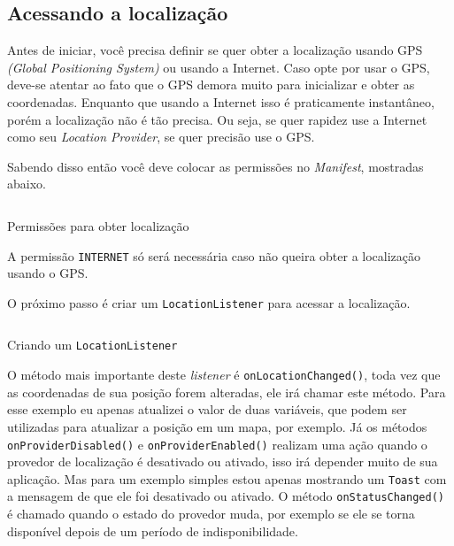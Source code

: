 \documentclass[a4paper,12pt,brazil]{book}
\begin{document}
\begin{singlespace}
		\section{Acessando a localização}
	
		Antes de iniciar, você precisa definir se quer obter a localização usando GPS \emph{(Global Positioning System)} ou usando a Internet. Caso opte por usar o GPS, deve-se atentar ao fato que o GPS demora muito para inicializar e obter as coordenadas. Enquanto que usando a Internet isso é praticamente instantâneo, porém a localização não é tão precisa. Ou seja, se quer rapidez use a Internet como seu \emph{Location Provider}, se quer precisão use o GPS.

		Sabendo disso então você deve colocar as permissões no \emph{Manifest}, mostradas abaixo.

		\begin{listing}[H]
		\inputminted[linenos=true,fontsize=\small,frame=lines, framesep=2mm, tabsize=2,numbersep=5pt]{xml}{src/api/maps/perm1.xml}
		\caption{Permissões para obter localização}
		\label{code:locationperm}
		\end{listing} 		

		A permissão \texttt{INTERNET} só será necessária caso não queira obter a localização usando o GPS.

		O próximo passo é criar um \texttt{LocationListener} para acessar a localização.

		\begin{listing}[H]
		\inputminted[linenos=true,fontsize=\small,frame=lines, framesep=2mm, tabsize=2,numbersep=5pt]{java}{src/api/maps/listener.java}
		\caption{Criando um \texttt{LocationListener}}
		\label{code:locationlistener}
		\end{listing} 	

		O método mais importante deste \emph{listener} é \texttt{onLocationChanged()}, toda vez que as coordenadas de sua posição forem alteradas, ele irá chamar este método. Para esse exemplo eu apenas atualizei o valor de duas variáveis, que podem ser utilizadas para atualizar a posição em um mapa, por exemplo. Já os métodos \texttt{onProviderDisabled()} e \texttt{onProviderEnabled()} realizam uma ação quando o provedor de localização é desativado ou ativado, isso irá depender muito de sua aplicação. Mas para um exemplo simples estou apenas mostrando um \texttt{Toast} com a mensagem de que ele foi desativado ou ativado. O método \texttt{onStatusChanged()} é chamado quando o estado do provedor muda, por exemplo se ele se torna disponível depois de um período de indisponibilidade.


\end{singlespace}
\end{document}
